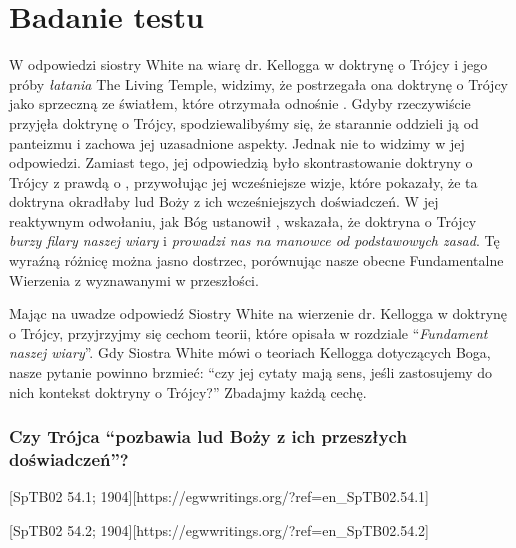 
\chapter{Badanie testu}

W odpowiedzi siostry White na wiarę dr. Kellogga w doktrynę o Trójcy i jego próby \textit{łatania} The Living Temple, widzimy, że postrzegała ona doktrynę o Trójcy jako sprzeczną ze światłem, które otrzymała odnośnie . Gdyby rzeczywiście przyjęła doktrynę o Trójcy, spodziewalibyśmy się, że starannie oddzieli ją od panteizmu i zachowa jej uzasadnione aspekty. Jednak nie to widzimy w jej odpowiedzi. Zamiast tego, jej odpowiedzią było skontrastowanie doktryny o Trójcy z prawdą o , przywołując jej wcześniejsze wizje, które pokazały, że ta doktryna okradłaby lud Boży z ich wcześniejszych doświadczeń. W jej reaktywnym odwołaniu, jak Bóg ustanowił , wskazała, że doktryna o Trójcy \textit{burzy filary naszej wiary} i \textit{prowadzi nas na manowce od podstawowych zasad}. Tę wyraźną różnicę można jasno dostrzec, porównując nasze obecne Fundamentalne Wierzenia z  wyznawanymi w przeszłości.

Mając na uwadze odpowiedź Siostry White na wierzenie dr. Kellogga w doktrynę o Trójcy, przyjrzyjmy się cechom teorii, które opisała w rozdziale “\textit{Fundament naszej wiary}”. Gdy Siostra White mówi o teoriach Kellogga dotyczących Boga, nasze pytanie powinno brzmieć: “czy jej cytaty mają sens, jeśli zastosujemy do nich kontekst doktryny o Trójcy?” Zbadajmy każdą cechę.

\subsection*{Czy Trójca “pozbawia lud Boży z ich przeszłych doświadczeń”?}

[SpTB02 54.1; 1904][https://egwwritings.org/?ref=en\_SpTB02.54.1]

[SpTB02 54.2; 1904][https://egwwritings.org/?ref=en\_SpTB02.54.2]

